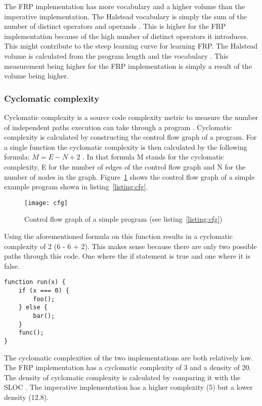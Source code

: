The FRP implementation has more vocabulary and a higher volume than the imperative implementation. The Halstead vocabulary is simply the sum of the number of distinct operators and operands \cite{ibm-halstead}. This is higher for the FRP implementation because of the high number of distinct operators it introduces. This might contribute to the steep learning curve for learning FRP. The Halstead volume is calculated from the program length and the vocabulary \cite{ibm-halstead}. This measurement being higher for the FRP implementation is simply a result of the volume being higher.

\subsubsection{Cyclomatic complexity}

Cyclomatic complexity is a source code complexity metric to measure the number of independent paths execution can take through a program \cite{cyclo}. Cyclomatic complexity is calculated by constructing the control flow graph of a program. For a single function the cyclomatic complexity is then calculated by the following formula: $M = E - N + 2$ \cite{cyclo}. In that formula M stands for the cyclomatic complexity, E for the number of edges of the control flow graph and N for the number of nodes in the graph. Figure~\ref{figure:cfg} shows the control flow graph of a simple example program shown in listing~\ref{listing:cfg}. 

\begin{figure}[H]
	\centering
	\texttt{[image: cfg]}
	\caption{Control flow graph of a simple program (see listing~\ref{listing:cfg})}
	\label{figure:cfg}
\end{figure}

Using the aforementioned formula on this function results in a cyclomatic complexity of 2 (6 - 6 + 2). This makes sense because there are only two possible paths through this code. One where the if statement is true and one where it is false.

\begin{lstlisting}[caption=Example code to illustrate the calculation of cyclomatic complexity,label=listing:cfg]
function run(x) {
	if (x === 0) {
		foo();
	} else {
		bar();
	}
	func();
}
\end{lstlisting}

The cyclomatic complexities of the two implementations are both relatively low. The FRP implementation has a cyclomatic complexity of 3 and a density of 20. The density of cyclomatic complexity is calculated by comparing it with the SLOC \cite{cyclo}. The imperative implementation has a higher complexity (5) but a lower density (12.8).

